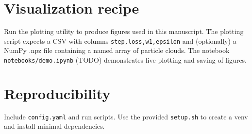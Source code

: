 \documentclass{article}
\begin{document}
\section{Visualization recipe}
Run the plotting utility to produce figures used in this manuscript. The plotting script expects a CSV with columns \texttt{step,loss,w1,epsilon} and (optionally) a NumPy .npz file containing a named array of particle clouds. The notebook \texttt{notebooks/demo.ipynb} (TODO) demonstrates live plotting and saving of figures.

\section{Reproducibility}
Include \texttt{config.yaml} and run scripts. Use the provided \texttt{setup.sh} to create a venv and install minimal dependencies.



\end{document}
